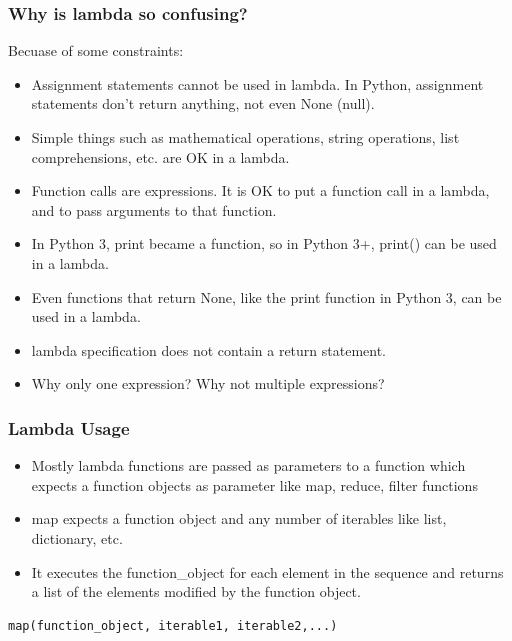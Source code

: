 \begin{frame}[fragile]\frametitle{Why is lambda so confusing?}
Becuase of some constraints:
    \begin{itemize}
    \item  Assignment statements cannot be used in lambda. In Python, assignment statements don't return anything, not even None (null).
    \item Simple things such as mathematical operations, string operations, list comprehensions, etc. are OK in a lambda.
    \item Function calls are expressions. It is OK to put a function call in a lambda, and to pass arguments to that function. 
    \item In Python 3, print became a function, so in Python 3+, print() can be used in a lambda.
\item Even functions that return None, like the print function in Python 3, can be used in a lambda.
    \item   lambda specification does not contain a return statement.
    \item Why only one expression? Why not multiple expressions? 
    \end{itemize}

\end{frame}


\begin{frame}[fragile]\frametitle{Lambda Usage}

    \begin{itemize}
    \item  Mostly lambda functions are passed as parameters to a function which expects a function objects as parameter like map, reduce, filter functions
	\item map expects a function object and any number of iterables like list, dictionary, etc.
\item It executes the function\_object for each element in the sequence and returns a list of the elements modified by the function object.
    \end{itemize}
	    \begin{lstlisting}
map(function_object, iterable1, iterable2,...)
\end{lstlisting}

\end{frame}


